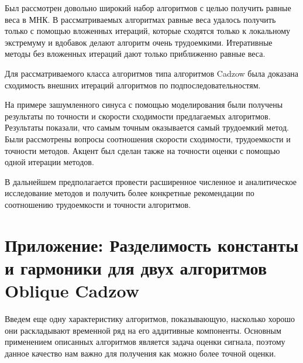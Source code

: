 \documentclass[12pt,a4paper,fleqn,leqno]{article}
\begin{document}
Был рассмотрен довольно широкий набор алгоритмов с целью получить равные веса в МНК. В рассматриваемых алгоритмах равные веса удалось
получить только с помощью вложенных итераций, которые сходятся только к локальному экстремуму и вдобавок делают алгоритм очень трудоемкими.
Итеративные методы без вложенных итераций дают только приближенно равные веса.

Для рассматриваемого класса алгоритмов типа алгоритмов Cadzow была доказана сходимость внешних итераций алгоритмов по подпоследовательностям.

На примере зашумленного синуса с помощью моделирования были получены результаты по точности и скорости сходимости предлагаемых алгоритмов.
Результаты показали, что самым точным оказывается самый трудоемкий метод.
Были рассмотрены вопросы соотношения скорости сходимости, трудоемкости и точности методов.
Акцент был сделан также на точности оценки с помощью одной итерации методов.

В дальнейшем предполагается провести расширенное численное и аналитическое исследование методов и получить более конкретные рекомендации по
соотношению трудоемкости и точности алгоритмов.

%



\section{Приложение: Разделимость константы и гармоники для двух алгоритмов Oblique Cadzow}
\label{sec:app}

Введем еще одну характеристику алгоритмов, показывающую, насколько хорошо они раскладывают временной ряд на его аддитивные компоненты. Основным применением описанных алгоритмов является задача оценки сигнала, поэтому данное качество нам важно для получения как можно более точной оценки.
\end{document}
